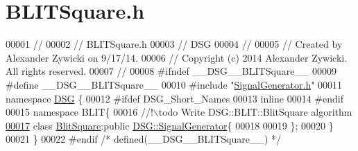 \hypertarget{_b_l_i_t_square_8h_source}{\section{B\+L\+I\+T\+Square.\+h}
\label{_b_l_i_t_square_8h_source}
}

\begin{DoxyCode}
00001 \textcolor{comment}{//}
00002 \textcolor{comment}{//  BLITSquare.h}
00003 \textcolor{comment}{//  DSG}
00004 \textcolor{comment}{//}
00005 \textcolor{comment}{//  Created by Alexander Zywicki on 9/17/14.}
00006 \textcolor{comment}{//  Copyright (c) 2014 Alexander Zywicki. All rights reserved.}
00007 \textcolor{comment}{//}
00008 \textcolor{preprocessor}{#ifndef \_\_DSG\_\_BLITSquare\_\_}
00009 \textcolor{preprocessor}{#define \_\_DSG\_\_BLITSquare\_\_}
00010 \textcolor{preprocessor}{#include "\hyperlink{_signal_generator_8h}{SignalGenerator.h}"}
00011 \textcolor{keyword}{namespace }\hyperlink{namespace_d_s_g}{DSG} \{
00012 \textcolor{preprocessor}{#ifdef DSG\_Short\_Names}
00013     \textcolor{keyword}{inline}
00014 \textcolor{preprocessor}{#endif}
00015     \textcolor{keyword}{namespace }BLIT\{\textcolor{comment}{}
00016 \textcolor{comment}{        //!\(\backslash\)todo Write DSG::BLIT::BlitSquare algorithm}
\hypertarget{_b_l_i_t_square_8h_source_l00017}{}\hyperlink{class_d_s_g_1_1_b_l_i_t_1_1_blit_square}{00017} \textcolor{comment}{}        \textcolor{keyword}{class }\hyperlink{class_d_s_g_1_1_b_l_i_t_1_1_blit_square}{BlitSquare}:\textcolor{keyword}{public} \hyperlink{class_d_s_g_1_1_signal_generator}{DSG::SignalGenerator}\{
00018 
00019         \};
00020     \}
00021 \}
00022 \textcolor{preprocessor}{#endif }\textcolor{comment}{/* defined(\_\_DSG\_\_BLITSquare\_\_) */}\textcolor{preprocessor}{}
\end{DoxyCode}
